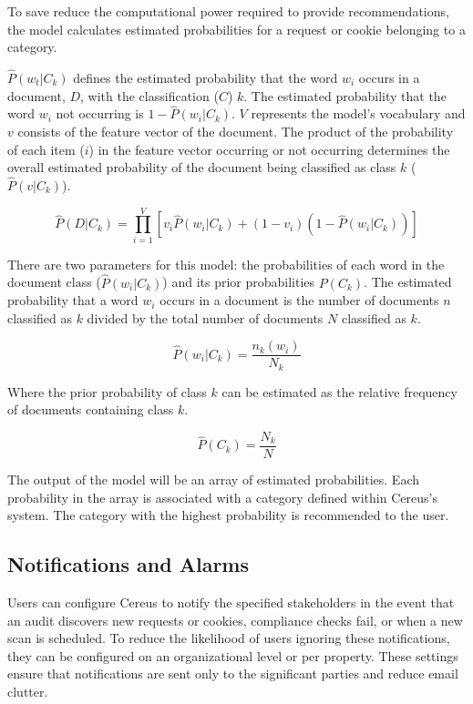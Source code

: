 To save reduce the computational power required to provide recommendations, the model calculates estimated probabilities for a request or cookie belonging to a category.

\(\hat{P}(w_{t}|C_{k})\) defines the estimated probability that the word \(w_{i}\) occurs in a document, \(D\), with the classification (\(C\)) \(k\). The estimated probability that the word \(w_{i}\) not occurring is \(1 - \hat{P}(w_{i}|C_{k})\). \(V\) represents the model's vocabulary and \(v\) consists of the feature vector of the document. The product of the probability of each item (\(i\)) in the feature vector occurring or not occurring determines the overall estimated probability of the document being classified as class \(k\) (\(\hat{P}(v|C_{k})\)).

\[
  \hat{P}(D|C_{k}) = \prod_{i=1}^{V}[v_{i}\hat{P}(w_{i}|C_{k}) + (1 - v_{i})(1 - \hat{P}(w_{i}|C_{k}))]
\]

There are two parameters for this model: the probabilities of each word in the document class (\(\hat{P}(w_{i}|C_{k})\)) and its prior probabilities \(P(C_{k})\). The estimated probability that a word \(w_{i}\) occurs in a document is the number of documents \(n\) classified as \(k\) divided by the total number of documents \(N\) classified as \(k\).

\[
  \hat{P}(w_{i}|C_{k}) = \frac{n_{k}(w_{i})}{N_{k}}
\]

Where the prior probability of class \(k\) can be estimated as the relative frequency of documents containing class \(k\).

\[
  \hat{P}(C_{k}) = \frac{N_{k}}{N}
\]

The output of the model will be an array of estimated probabilities. Each probability in the array is associated with a category defined within Cereus's system. The category with the highest probability is recommended to the user.

\subsection{Notifications and Alarms}

Users can configure Cereus to notify the specified stakeholders in the event that an audit discovers new requests or cookies, compliance checks fail, or when a new scan is scheduled. To reduce the likelihood of users ignoring these notifications, they can be configured on an organizational level or per property. These settings ensure that notifications are sent only to the significant parties and reduce email clutter.

